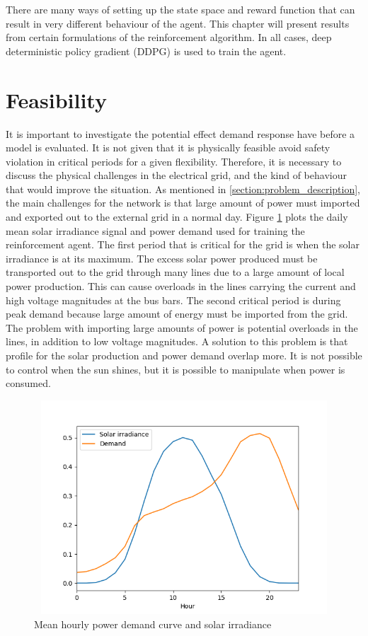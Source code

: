 \documentclass[class=book, crop=false]{standalone}
\begin{document}
There are many ways of setting up the state space and reward function that can result in very different behaviour of the agent. This chapter will present results from certain formulations of the reinforcement algorithm. In all cases, deep deterministic policy gradient (DDPG) is used to train the agent. 

\section{Feasibility}
It is important to investigate the potential effect demand response have before a model is evaluated. It is not given that it is physically feasible avoid safety violation in critical periods for a given flexibility. Therefore, it is necessary to discuss the physical challenges in the electrical grid, and the kind of behaviour that would improve the situation. As mentioned in \ref{section:problem_description}, the main challenges for the network is that large amount of power must imported and exported out to the external grid in a normal day. Figure \ref{fig:results:demand_and_solar} plots the daily mean solar irradiance signal and power demand used for training the reinforcement agent. The first period that is critical for the grid is when the solar irradiance is at its maximum. The excess solar power produced must be transported out to the grid through many lines due to a large amount of local power production. This can cause overloads in the lines carrying the current and high voltage magnitudes at the bus bars. The second critical period is during peak demand because large amount of energy must be imported from the grid. The problem with importing large amounts of power is potential overloads in the lines, in addition to low voltage magnitudes. A solution to this problem is that profile for the solar production and power demand overlap more. It is not possible to control when the sun shines, but it is possible to manipulate when power is consumed.
\begin{figure}[h]
    \center
\includegraphics[height=8cm, width=12cm]{figures/demand_and_solar.png}
    \caption[size = 9]{Mean hourly power demand curve and solar irradiance}
    \label{fig:results:demand_and_solar}
\end{figure}
\end{document}
